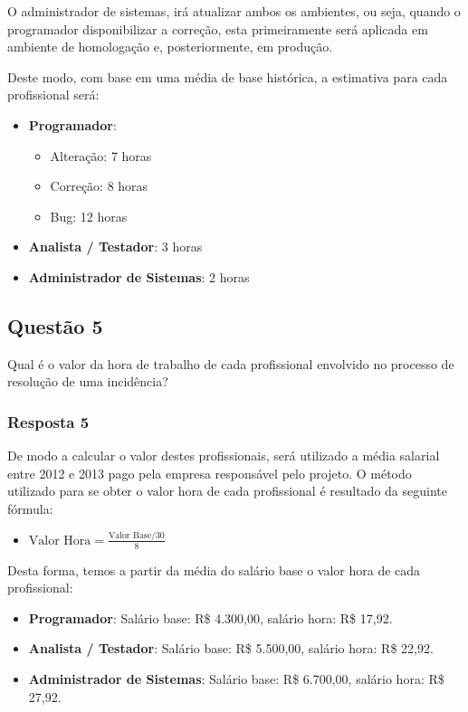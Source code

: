 \documentclass[11pt, a4paper]{article}
\begin{document}
O administrador de sistemas, irá atualizar ambos os ambientes, ou seja, quando o programador disponibilizar a correção, esta primeiramente será aplicada em ambiente de homologação e, posteriormente, em produção.

Deste modo, com base em uma média de base histórica, a estimativa para cada profissional será:

\begin{itemize}
	\item \textbf{Programador}: 
		\begin{itemize}
			\item Alteração: 7 horas
			\item Correção: 8 horas
			\item Bug: 12 horas
		\end{itemize}
	\item \textbf{Analista / Testador}: 3 horas
	\item \textbf{Administrador de Sistemas}: 2 horas
\end{itemize}

\subsection{Questão 5}\label{sec:questao-5}
Qual é o valor da hora de trabalho de cada profissional envolvido no processo de resolução de uma incidência?

\subsubsection{Resposta 5}
De modo a calcular o valor destes profissionais, será utilizado a média salarial entre 2012 e 2013 pago pela empresa responsável pelo projeto. O método utilizado para se obter o valor hora de cada profissional é resultado da seguinte fórmula: 

\begin{itemize}
  \item[] \textbf{$\text{Valor Hora}=\frac{\text{Valor Base} / 30}{8}$}
\end{itemize}

Desta forma, temos a partir da média do salário base o valor hora de cada profissional:

\begin{itemize}
	\item \textbf{Programador}: Salário base: R\$ 4.300,00, salário hora: R\$ 17,92.
	\item \textbf{Analista / Testador}: Salário base: R\$ 5.500,00, salário hora: R\$ 22,92.
	\item \textbf{Administrador de Sistemas}: Salário base: R\$ 6.700,00, salário hora: R\$ 27,92.
\end{itemize}
\end{document}
